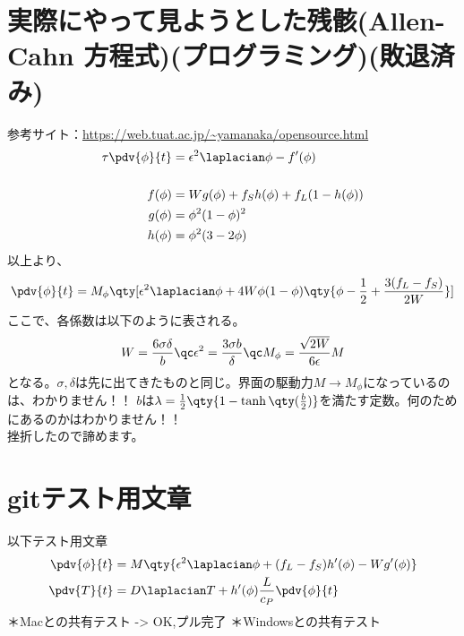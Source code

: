\documentclass[twocolumn,landscape]{ltjsarticle}
\begin{document}
\section{実際にやって見ようとした残骸(Allen-Cahn 方程式)(プログラミング)(敗退済み)}
参考サイト：\url{https://web.tuat.ac.jp/~yamanaka/opensource.html}
\begin{equation}
  \begin{split}
    \tau\pdv{\phi}{t} & =\epsilon^2\laplacian\phi-f'(\phi)    \\
    \\
    f(\phi)           & =W g(\phi)+f_S h(\phi)+f_L(1-h(\phi)) \\
    g(\phi)           & =\phi^2(1-\phi)^2                     \\
    h(\phi)           & =\phi^2(3-2\phi)
  \end{split}
\end{equation}
以上より、
\begin{equation}
  \pdv{\phi}{t}=M_\phi\qty[\epsilon^2\laplacian\phi+4W\phi(1-\phi)\qty{\phi-\frac{1}{2}+\frac{3(f_L-f_S)}{2W}}]
\end{equation}
ここで、各係数は以下のように表される。
\begin{equation}
  W=\frac{6\sigma\delta}{b}\qc\epsilon^2=\frac{3\sigma b}{\delta}\qc M_\phi=\frac{\sqrt{2W}}{6\epsilon}M
\end{equation}
となる。$\sigma,\delta$は先に出てきたものと同じ。界面の駆動力$M\rightarrow M_\phi$になっているのは、\color{red}わかりません！！\color{black}
$b$は$\lambda=\frac{1}{2}\qty{1-\tanh\qty(\frac{b}{2})}$を満たす定数。\color{red}何のためにあるのかはわかりません！！\color{black}\\
挫折したので諦めます。

\section{gitテスト用文章}
以下テスト用文章
\begin{equation}
  \begin{split}
    \pdv{\phi}{t} & =M\qty{\epsilon^2\laplacian\phi+(f_L-f_S)h'(\phi)-Wg'(\phi)} \\
    \pdv{T}{t}    & =D\laplacian T+h'(\phi)\frac{L}{c_P}\pdv{\phi}{t}
  \end{split}
\end{equation}
＊Macとの共有テスト -> OK,プル完了
＊Windowsとの共有テスト
\end{document}
